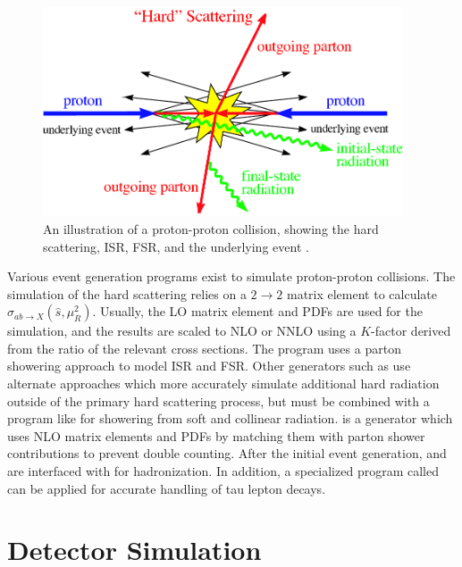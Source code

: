 \begin{figure}[hbt]
\begin{center}
\includegraphics[width=0.95\textwidth]{figures/pp_collision_schematic.pdf}
\caption{An illustration of a proton-proton collision, showing the hard scattering, ISR, FSR, and the underlying event \cite{QuarkGluon}.}
\label{fig:pp-collision}
\end{center}
\end{figure}

Various event generation programs exist to simulate proton-proton collisions. The simulation of the hard scattering relies on a $2\rightarrow2$ matrix element to calculate $\hat{\sigma}_{ab \rightarrow X}(\hat{s},\mu_{R}^{2})$. Usually, the LO matrix element and PDFs are used for the simulation, and the results are scaled to NLO or NNLO using a $K$-factor derived from the ratio of the relevant cross sections. The program \PYTHIA \cite{Sjostrand:2006za} uses a parton showering approach to model ISR and FSR. Other generators such as \MADGRAPH \cite{MadGraph} use alternate approaches which more accurately simulate additional hard radiation outside of the primary hard scattering process, but must be combined with a program like \PYTHIA for showering from soft and collinear radiation. \POWHEG \cite{NasonPOWHEG,Alioli:2010xd} is a generator which uses NLO matrix elements and PDFs by matching them with parton shower contributions to prevent double counting. After the initial event generation, \MADGRAPH and \POWHEG are interfaced with \PYTHIA for hadronization. In addition, a specialized program called \TAUOLA \cite{TAUOLA} can be applied for accurate handling of tau lepton decays.

\section{Detector Simulation}


